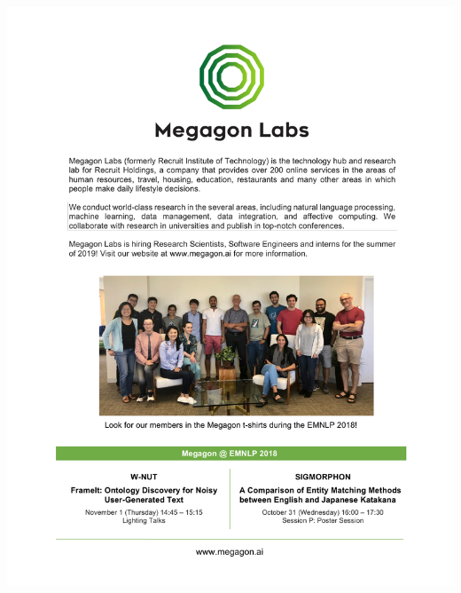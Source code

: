 \thispagestyle{empty}
\begin{center}
  \vfill
  \includegraphics[width=\textwidth]{content/ads/full/megagon.pdf}
  \vfill
\end{center}

